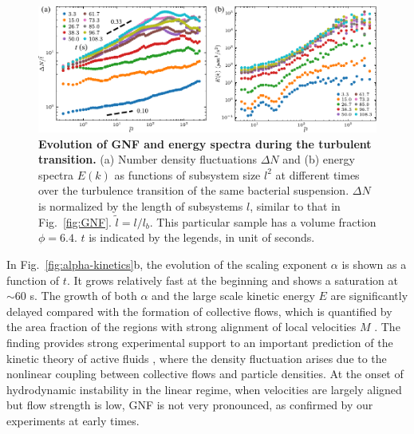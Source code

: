 \begin{figure}[!ht]
\begin{center}
\includegraphics[width=5.5in]{figs/5-GNF/8.pdf}
\caption[Evolution of GNF and energy spectra during the turbulent transition]
{
\textbf{Evolution of GNF and energy spectra during the turbulent transition.} (a) Number density fluctuations $\Delta N$ and (b) energy spectra $E(k)$ as functions of subsystem size $l^2$ at different times over the turbulence transition of the same bacterial suspension. $\Delta N$ is normalized by the length of subsystems $l$, similar to that in Fig.~\ref{fig:GNF}. $\tilde{l} = l/l_b$. This particular sample has a volume fraction $\phi=6.4$. $t$ is indicated by the legends, in unit of seconds.
}
\label{fig:GNF-energy-spectra-kinetics}
\end{center}
\end{figure}

In Fig.~\ref{fig:alpha-kinetics}b, the evolution of the scaling exponent $\alpha$ is shown as a function of $t$. It grows relatively fast at the beginning and shows a saturation at $\sim 60$ s. The growth of both $\alpha$ and the large scale kinetic energy $E$ are significantly delayed compared with the formation of collective flows, which is quantified by the area fraction of the regions with strong alignment of local velocities $M$ \cite{Peng2020}.
The finding provides strong experimental support to an important prediction of the kinetic theory of active fluids \cite{Saintillan2008a,Saintillan2008b}, where the density fluctuation arises due to the nonlinear coupling between collective flows and particle densities. At the onset of hydrodynamic instability in the linear regime, when velocities are largely aligned but flow strength is low, GNF is not very pronounced, as confirmed by our experiments at early times.

